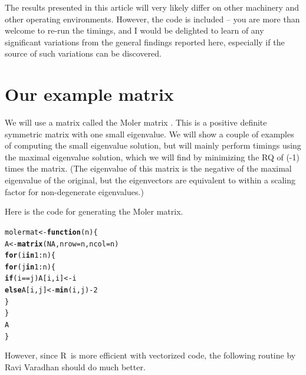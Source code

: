 \documentclass[10pt]{article}\usepackage[]{graphicx}\usepackage[]{color}
\makeatletter
\newcommand{\hlnum}[1]{\textcolor[rgb]{0.686,0.059,0.569}{#1}}%
\newcommand{\hlopt}[1]{\textcolor[rgb]{0,0,0}{#1}}%
\newcommand{\hlstd}[1]{\textcolor[rgb]{0.345,0.345,0.345}{#1}}%
\newcommand{\hlkwa}[1]{\textcolor[rgb]{0.161,0.373,0.58}{\textbf{#1}}}%
\newcommand{\hlkwb}[1]{\textcolor[rgb]{0.69,0.353,0.396}{#1}}%
\newcommand{\hlkwc}[1]{\textcolor[rgb]{0.333,0.667,0.333}{#1}}%
\newcommand{\hlkwd}[1]{\textcolor[rgb]{0.737,0.353,0.396}{\textbf{#1}}}%
\newenvironment{kframe}{%
 \def\at@end@of@kframe{}%
 \ifinner\ifhmode%
  \def\at@end@of@kframe{\end{minipage}}%
  \begin{minipage}{\columnwidth}%
 \fi\fi%
 \def\FrameCommand##1{\hskip\@totalleftmargin \hskip-\fboxsep
 \colorbox{shadecolor}{##1}\hskip-\fboxsep
     \hskip-\linewidth \hskip-\@totalleftmargin \hskip\columnwidth}%
 \MakeFramed {\advance\hsize-\width
   \@totalleftmargin\z@ \linewidth\hsize
   \@setminipage}}%
 {\par\unskip\endMakeFramed%
 \at@end@of@kframe}
\newenvironment{knitrout}{}{} %
\newcommand{\R}{{\sf R\ }}
\makeatother
\begin{document}
The results presented in this article will very likely differ on other 
machinery and other operating environments. However, the code is included -- you
are more than welcome to re-run the timings, and I would be delighted to learn
of any significant variations from the general findings reported here, especially
if the source of such variations can be discovered. 


\section{Our example matrix}

We will use a matrix called the Moler matrix \cite[Appendix 1]{cnm79}. 
This is a positive definite
symmetric matrix with one small eigenvalue. We will show a couple of 
examples of computing the small eigenvalue solution, but will mainly
perform timings using the maximal eigenvalue solution, which we will
find by minimizing the RQ of (-1) times the matrix. (The eigenvalue
of this matrix is the negative of the maximal eigenvalue of the 
original, but the eigenvectors are equivalent to within a scaling
factor for non-degenerate eigenvalues.)

Here is the code for generating the Moler matrix.

\begin{knitrout}\scriptsize
{}\color{fgcolor}\begin{kframe}
\begin{alltt}
\hlstd{molermat}\hlkwb{<-}\hlkwa{function}\hlstd{(}\hlkwc{n}\hlstd{)\{}
   \hlstd{A}\hlkwb{<-}\hlkwd{matrix}\hlstd{(}\hlnum{NA}\hlstd{,} \hlkwc{nrow}\hlstd{=n,} \hlkwc{ncol}\hlstd{=n)}
   \hlkwa{for} \hlstd{(i} \hlkwa{in} \hlnum{1}\hlopt{:}\hlstd{n)\{}
      \hlkwa{for} \hlstd{(j} \hlkwa{in} \hlnum{1}\hlopt{:}\hlstd{n) \{}
          \hlkwa{if} \hlstd{(i} \hlopt{==} \hlstd{j) A[i,i]}\hlkwb{<-}\hlstd{i}
          \hlkwa{else} \hlstd{A[i,j]}\hlkwb{<-}\hlkwd{min}\hlstd{(i,j)} \hlopt{-} \hlnum{2}
      \hlstd{\}}
   \hlstd{\}}
   \hlstd{A}
\hlstd{\}}
\end{alltt}
\end{kframe}
\end{knitrout}

However, since \R is more efficient with vectorized code, the following routine by 
Ravi Varadhan should do much better.
\end{document}
